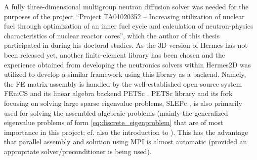 A fully three-dimensional multigroup neutron diffusion solver was needed for the purposes of
the project ``Project TA01020352 -- Increasing utilization of nuclear fuel through optimization of an inner fuel cycle
and calculation of neutron-physics characteristics of nuclear reactor cores'', which the author of this thesis
participated in during his doctoral studies. As the 3D version of Hermes has not been released yet, another
finite-element library has been chosen and the experience obtained from developing the neutronics solvers within
Hermes2D was utilized to develop a similar framework using this library as a backend. Namely, the FE matrix assembly is
handled by the well-established open-source system FEniCS \cite{dolfin1, dolfin2} and its linear algebra backend PETSc \cite{petsc1}. PETSc library and its fork focusing on solving large sparse
eigenvalue problems, SLEPc \cite{slepc1}, is also primarily used for solving the assembled algebraic problems (mainly
the generalized eigenvalue problems of form \eqref{eq:discrete_eigenproblem} that are of most importance in this
project; cf. also the introduction to ). This has the advantage that parallel assembly and
solution using MPI is almost automatic (provided an appropriate solver/preconditioner is being used). %

